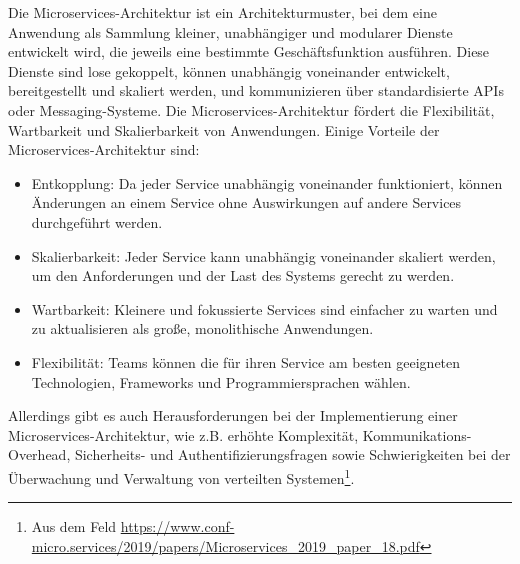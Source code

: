 \documentclass[../vs-script-first-v01.tex]{subfiles}
\begin{document}
Die Microservices-Architektur ist ein Architekturmuster, bei dem eine Anwendung als Sammlung kleiner, unabhängiger und modularer Dienste entwickelt wird, die jeweils eine bestimmte Geschäftsfunktion ausführen. Diese Dienste sind lose gekoppelt, können unabhängig voneinander entwickelt, bereitgestellt und skaliert werden, und kommunizieren über standardisierte APIs oder Messaging-Systeme. Die Microservices-Architektur fördert die Flexibilität, Wartbarkeit und Skalierbarkeit von Anwendungen.
Einige Vorteile der Microservices-Architektur sind:
\begin{itemize}
\item Entkopplung: Da jeder Service unabhängig voneinander funktioniert, können Änderungen an einem Service ohne Auswirkungen auf andere Services durchgeführt werden.
\item Skalierbarkeit: Jeder Service kann unabhängig voneinander skaliert werden, um den Anforderungen und der Last des Systems gerecht zu werden.
\item Wartbarkeit: Kleinere und fokussierte Services sind einfacher zu warten und zu aktualisieren als große, monolithische Anwendungen.
\item Flexibilität: Teams können die für ihren Service am besten geeigneten Technologien, Frameworks und Programmiersprachen wählen.
\end{itemize}
Allerdings gibt es auch Herausforderungen bei der Implementierung einer Microservices-Architektur, wie z.B. erhöhte Komplexität, Kommunikations-Overhead, Sicherheits- und Authentifizierungsfragen sowie Schwierigkeiten bei der Überwachung und Verwaltung von verteilten Systemen\footnote{Aus dem Feld \url{https://www.conf-micro.services/2019/papers/Microservices_2019_paper_18.pdf}}.
\end{document}
